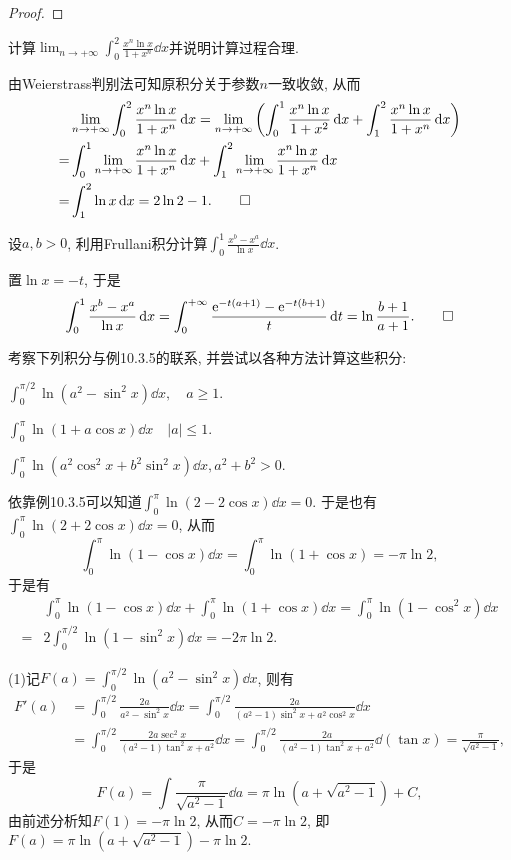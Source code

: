 \begin{quiza}
\begin{proof}
\end{proof}
\woe 计算\(\lim_{n\rightarrow+\infty}\int_{0}^{2}\frac{x^n\ln x}{1+x^n}\dd x\)并说明计算过程合理.
\begin{solution}
由Weierstrass判别法可知原积分关于参数\(n\)一致收敛, 从而\[\begin{split}
&\lim_{n\rightarrow+\infty}\int_{0}^{2}\frac{x^n\ln x}{1+x^n}\,\mathrm{d} x=\lim_{n\rightarrow+\infty}\left(\int_{0}^{1}\frac{x^n\ln x}{1+x^2}\,\mathrm{d} x+\int_{1}^{2}\frac{x^n\ln x}{1+x^n}\,\mathrm{d} x\right)\\=&\int_{0}^{1}\lim_{n\rightarrow+\infty}\frac{x^n\ln x}{1+x^n}\,\mathrm{d} x+\int_{1}^{2}\lim_{n\rightarrow+\infty}\frac{x^n\ln x}{1+x^n}\,\mathrm{d} x\\=&\int_{1}^{2}\ln x\,\mathrm{d} x=2\ln 2-1.\qedhere
\end{split}\]
\end{solution}
\woe 设\(a,b>0\), 利用Frullani积分计算\(\int_{0}^{1}\frac{x^b-x^a}{\ln x}\dd x\).
\begin{solution}
置\(\ln x=-t\), 于是\[\int_{0}^{1}\frac{x^b-x^a}{\ln x}\,\mathrm{d} x=\int_{0}^{+\infty}\frac{\mathrm{e}^{-t(a+1)}-\mathrm{e}^{-t(b+1)}}{t}\,\mathrm{d} t=\ln\frac{b+1}{a+1}.\qedhere\]
\end{solution}
\woe 考察下列积分与例10.3.5的联系, 并尝试以各种方法计算这些积分:
\begin{quizs}
\item \(\int_{0}^{\pi/2}\ln(a^2-\sin^2x)\dd x,\quad a\geqslant 1.\)
\item \(\int_{0}^{\pi}\ln(1+a\cos x)\dd x\quad |a|\leqslant 1\).
\item \(\int_{0}^{\pi}\ln(a^2\cos^2 x+b^2\sin^2x)\dd x,a^2+b^2>0.\)
\end{quizs}
\begin{solution}
依靠例10.3.5可以知道\(\int_{0}^{\pi}\ln\left(2-2\cos x\right)\dd x=0.\) 于是也有\(\int_{0}^{\pi}\ln(2+2\cos x)\dd x=0\), 从而\[\int_{0}^{\pi}\ln\left(1-\cos x\right)\dd x=\int_{0}^{\pi}\ln\left(1+\cos x\right)=-\pi\ln 2,\]于是有\[\begin{split}
&\int_{0}^{\pi}\ln\left(1-\cos x\right)\dd x+\int_{0}^{\pi}\ln\left(1+\cos x\right)\dd x=\int_{0}^{\pi}\ln\left(1-\cos^2x\right)\dd x\\=&2\int_{0}^{\pi/2}\ln\left(1-\sin^2x\right)\dd x=-2\pi\ln 2.
\end{split}\]

(1)记\(F(a)=\int_{0}^{\pi/2}\ln\left(a^2-\sin^2x\right)\dd x\), 则有\[\begin{split}
F'(a)&=\int_{0}^{\pi/2}\frac{2a}{a^2-\sin^2x}\dd x=\int_{0}^{\pi/2}\frac{2a}{(a^2-1)\sin^2x+a^2\cos^2x}\dd x\\
&=\int_{0}^{\pi/2}\frac{2a\sec^2x}{(a^2-1)\tan^2x+a^2}\dd x=\int_{0}^{\pi/2}\frac{2a}{(a^2-1)\tan^2x+a^2}\dd\left(\tan x\right)=\frac{\pi}{\sqrt{a^2-1}},
\end{split}\]于是\[F(a)=\int\frac{\pi}{\sqrt{a^2-1}}\dd a=\pi\ln(a+\sqrt{a^2-1})+C,\]由前述分析知\(F(1)=-\pi\ln 2\), 从而\(C=-\pi\ln 2\), 即\(F(a)=\pi\ln\left(a+\sqrt{a^2-1}\right)-\pi\ln 2\).


\end{solution}
\end{quiza}
